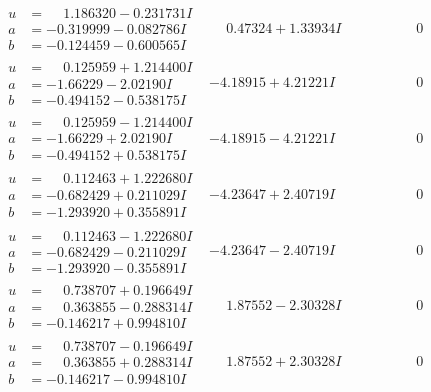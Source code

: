 \documentclass[1p]{elsarticle_modified}
\theoremstyle{definition}
\begin{document}
$$\begin{array}{c|c|c}
\begin{aligned}
u &= \phantom{-}1.186320 - 0.231731 I \\
a &= -0.319999 - 0.082786 I \\
b &= -0.124459 - 0.600565 I\end{aligned}
 & \phantom{-}0.47324 + 1.33934 I & \phantom{-0.000000 } 0 \\ \hline\begin{aligned}
u &= \phantom{-}0.125959 + 1.214400 I \\
a &= -1.66229 - 2.02190 I \\
b &= -0.494152 - 0.538175 I\end{aligned}
 & -4.18915 + 4.21221 I & \phantom{-0.000000 } 0 \\ \hline\begin{aligned}
u &= \phantom{-}0.125959 - 1.214400 I \\
a &= -1.66229 + 2.02190 I \\
b &= -0.494152 + 0.538175 I\end{aligned}
 & -4.18915 - 4.21221 I & \phantom{-0.000000 } 0 \\ \hline\begin{aligned}
u &= \phantom{-}0.112463 + 1.222680 I \\
a &= -0.682429 + 0.211029 I \\
b &= -1.293920 + 0.355891 I\end{aligned}
 & -4.23647 + 2.40719 I & \phantom{-0.000000 } 0 \\ \hline\begin{aligned}
u &= \phantom{-}0.112463 - 1.222680 I \\
a &= -0.682429 - 0.211029 I \\
b &= -1.293920 - 0.355891 I\end{aligned}
 & -4.23647 - 2.40719 I & \phantom{-0.000000 } 0 \\ \hline\begin{aligned}
u &= \phantom{-}0.738707 + 0.196649 I \\
a &= \phantom{-}0.363855 - 0.288314 I \\
b &= -0.146217 + 0.994810 I\end{aligned}
 & \phantom{-}1.87552 - 2.30328 I & \phantom{-0.000000 } 0 \\ \hline\begin{aligned}
u &= \phantom{-}0.738707 - 0.196649 I \\
a &= \phantom{-}0.363855 + 0.288314 I \\
b &= -0.146217 - 0.994810 I\end{aligned}
 & \phantom{-}1.87552 + 2.30328 I & \phantom{-0.000000 } 0 \\ \hline\begin{aligned}

\end{aligned}
\end{array}$$
\end{document}
